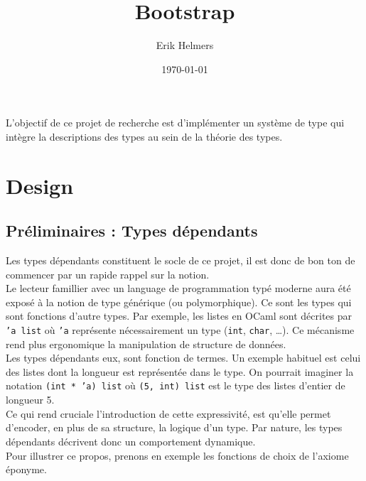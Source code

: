 \documentclass[11pt]{article}
\author{Erik Helmers}
\date{\today}
\title{Bootstrap}
\begin{document}
\maketitle
\tableofcontents

L'objectif de ce projet de recherche est d'implémenter un système de type qui intègre la descriptions des types au sein de la théorie des types.

\section{Design}
\label{sec:org26d00d7}

\subsection{Préliminaires : Types dépendants}
\label{sec:org1e3921b}

Les types dépendants constituent le socle de ce projet, il est donc de bon ton de commencer par un rapide rappel sur la notion. \\[0pt]

Le lecteur famillier avec un language de programmation typé moderne aura été exposé à la notion de type générique (ou polymorphique). Ce sont les types qui sont fonctions d'autre types. Par exemple, les listes en OCaml sont décrites par \texttt{'a list} où \texttt{'a} représente nécessairement un type (\texttt{int}, \texttt{char}, \ldots{}). Ce mécanisme rend plus ergonomique la manipulation de structure de données. \\[0pt]

Les types dépendants eux, sont fonction de termes. Un exemple habituel est celui des listes dont la longueur est représentée dans le type. On pourrait imaginer la notation \texttt{(int * 'a) list} où \texttt{(5, int) list} est le type des listes d'entier de longueur 5. \\[0pt]

Ce qui rend cruciale l'introduction de cette expressivité, est qu'elle permet d'encoder, en plus de sa structure, la logique d'un type. Par nature, les types dépendants décrivent donc un comportement dynamique.\\[0pt]

Pour illustrer ce propos, prenons en exemple les fonctions de choix de l'axiome éponyme.
\end{document}
